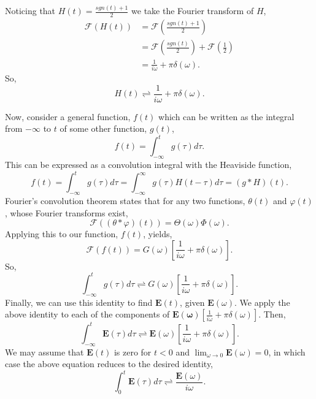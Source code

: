 \documentclass[12pt,twocolumn]{article}
\begin{document}
Noticing that $H(t)=\frac{\mathit{sgn}(t)+1}{2}$ we take the Fourier transform of $H$,
\begin{equation*}
\begin{aligned}
\mathcal{F}(H(t))&=\mathcal{F}\left(\frac{\mathit{sgn}(t)+1}{2}\right) \\
&=\mathcal{F}\left(\frac{\mathit{sgn}(t)}{2}\right)+\mathcal{F}\left(\frac{1}{2}\right) \\
&= \frac{1}{i\omega}+\pi\delta(\omega).
\end{aligned}
\end{equation*}
So,
\begin{equation}
H(t)\rightleftharpoons\frac{1}{i\omega}+\pi\delta(\omega).
\end{equation}

Now, consider a general function, $f(t)$ which can be written as the integral from $-\infty$ to $t$ of some other function, $g(t)$,
\begin{equation}
f(t)=\int_{-\infty}^{t}g(\tau)d\tau.
\end{equation}
This can be expressed as a convolution integral with the Heaviside function,
\begin{equation}
f(t)=\int_{-\infty}^{t}g(\tau)d\tau = \int_{-\infty}^{\infty}g(\tau)H(t-\tau)d\tau=(g*H)(t).
\end{equation}
Fourier's convolution theorem states that for any two functions, $\theta(t)$ and $\varphi(t)$, whose Fourier transforms exist,
\begin{equation}
\mathcal{F}((\theta*\varphi)(t)) = \Theta(\omega)\varPhi(\omega).
\end{equation}
Applying this to our function, $f(t)$, yields,
\begin{equation}
\mathcal{F}(f(t)) = G(\omega)\left[\frac{1}{i\omega}+\pi\delta(\omega)\right].
\end{equation}
So,
\begin{equation}
\int_{-\infty}^{t}g(\tau)d\tau\rightleftharpoons G(\omega)\left[\frac{1}{i\omega}+\pi\delta(\omega)\right].
\end{equation}
Finally, we can use this identity to find $\mathbf{E}(t)$, given $\mathbf{E}(\omega)$. We apply the above identity to each of the components of $\mathbf{E(\omega)}\left[\frac{1}{i\omega}+\pi\delta(\omega)\right]$. Then,
\begin{equation}
\int_{-\infty}^{t}\mathbf{E}(\tau)d\tau\rightleftharpoons \mathbf{E}(\omega)\left[\frac{1}{i\omega}+\pi\delta(\omega)\right].
\end{equation}
We may assume that $\mathbf{E}(t)$ is zero for $t<0$ and $\lim_{\omega\rightarrow 0}\mathbf{E}(\omega)=0$, in which case the above equation reduces to the desired identity,
\begin{equation}
\int_0^t\mathbf{E}(\tau)d\tau\rightleftharpoons \frac{\mathbf{E}(\omega)}{i\omega}.
\end{equation}
\newpage
\end{document}
